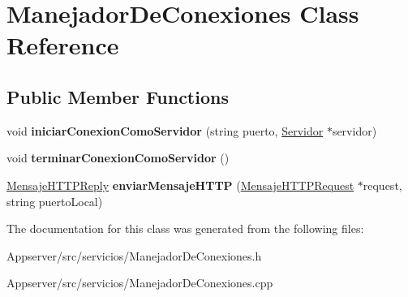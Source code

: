 \hypertarget{classManejadorDeConexiones}{}\section{Manejador\+De\+Conexiones Class Reference}
\label{classManejadorDeConexiones}
\subsection*{Public Member Functions}
\begin{DoxyCompactItemize}
\item 
void {\bfseries iniciar\+Conexion\+Como\+Servidor} (string puerto, \hyperlink{classServidor}{Servidor} $\ast$servidor)\hypertarget{classManejadorDeConexiones_a66bae5cdd4959f6cc555534749b3ebb1}{}\label{classManejadorDeConexiones_a66bae5cdd4959f6cc555534749b3ebb1}

\item 
void {\bfseries terminar\+Conexion\+Como\+Servidor} ()\hypertarget{classManejadorDeConexiones_a8e26d47396e240d2c891b0c14a6ca321}{}\label{classManejadorDeConexiones_a8e26d47396e240d2c891b0c14a6ca321}

\item 
\hyperlink{classMensajeHTTPReply}{Mensaje\+H\+T\+T\+P\+Reply} {\bfseries enviar\+Mensaje\+H\+T\+TP} (\hyperlink{classMensajeHTTPRequest}{Mensaje\+H\+T\+T\+P\+Request} $\ast$request, string puerto\+Local)\hypertarget{classManejadorDeConexiones_a5ddc9c13584c9ccdda092c2330e1856b}{}\label{classManejadorDeConexiones_a5ddc9c13584c9ccdda092c2330e1856b}

\end{DoxyCompactItemize}


The documentation for this class was generated from the following files\+:\begin{DoxyCompactItemize}
\item 
Appserver/src/servicios/Manejador\+De\+Conexiones.\+h\item 
Appserver/src/servicios/Manejador\+De\+Conexiones.\+cpp\end{DoxyCompactItemize}
